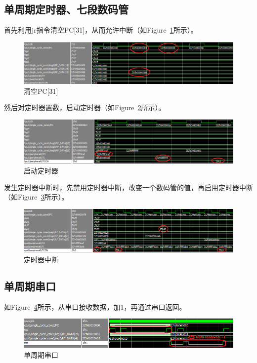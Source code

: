 \documentclass{article}
\begin{document}
        \subsection{单周期定时器、七段数码管}
            首先利用jr指令清空PC[31]，从而允许中断（如Figure~\ref{fig:singlecycle_digi1}所示）。
            \begin{figure}[H]
                \centering
                \includegraphics[width=\textwidth]{images/singlecycle_digi1.png}
                \caption{\label{fig:singlecycle_digi1}清空PC[31]}
            \end{figure}
            然后对定时器置数，启动定时器（如Figure~\ref{fig:singlecycle_digi2}所示）。
            \begin{figure}[H]
                \centering
                \includegraphics[width=\textwidth]{images/singlecycle_digi2.png}
                \caption{\label{fig:singlecycle_digi2}启动定时器}
            \end{figure}
            发生定时器中断时，先禁用定时器中断，改变一个数码管的值，再启用定时器中断（如Figure~\ref{fig:singlecycle_digi3}所示）。
            \begin{figure}[H]
                \centering
                \includegraphics[width=\textwidth]{images/singlecycle_digi3.png}
                \caption{\label{fig:singlecycle_digi3}定时器中断}
            \end{figure}

        \subsection{单周期串口}
            如Figure~\ref{fig:singlecycle_uart}所示，从串口接收数据，加1，再通过串口返回。
            \begin{figure}[H]
                \centering
                \includegraphics[width=\textwidth]{images/singlecycle_uart.png}
                \caption{\label{fig:singlecycle_uart}单周期串口}
            \end{figure}
\end{document}
